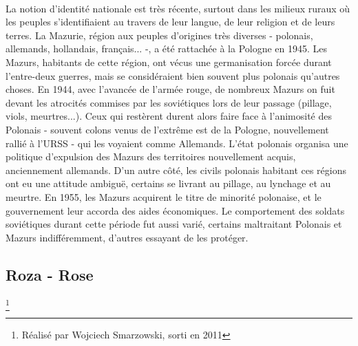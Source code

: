 \documentclass[12pt]{amsart}
\begin{document}
\paragraph{}
La notion d'identité nationale est très récente, surtout dans les milieux ruraux où les peuples s'identifiaient au travers de leur langue, de leur religion et de leurs terres. La Mazurie, région aux peuples d'origines très diverses - polonais, allemands, hollandais, français... -, a été rattachée à la Pologne en 1945. Les Mazurs, habitants de cette région, ont vécus une germanisation forcée durant l'entre-deux guerres, mais se considéraient bien souvent plus polonais qu'autres choses. En 1944, avec l'avancée de l'armée rouge, de nombreux Mazurs on fuit devant les atrocités commises par les soviétiques lors de leur passage (pillage, viols, meurtres...). Ceux qui restèrent durent alors faire face à l'animosité des Polonais - souvent colons venus de l'extrême est de la Pologne, nouvellement rallié à l'URSS - qui les voyaient comme Allemands. L'état polonais organisa une politique d'expulsion des Mazurs des territoires nouvellement acquis, anciennement allemands. D'un autre côté, les civils polonais habitant ces régions ont eu une attitude ambiguë, certains se livrant au pillage, au lynchage et au meurtre. En 1955, les Mazurs acquirent le titre de minorité polonaise, et le gouvernement leur accorda des aides économiques. Le comportement des soldats soviétiques durant cette période fut aussi varié, certains maltraitant Polonais et Mazurs indifféremment, d'autres essayant de les protéger.
\subsection*{Roza - Rose}\footnote{Réalisé par Wojciech Smarzowski, sorti en 2011}
\end{document}
